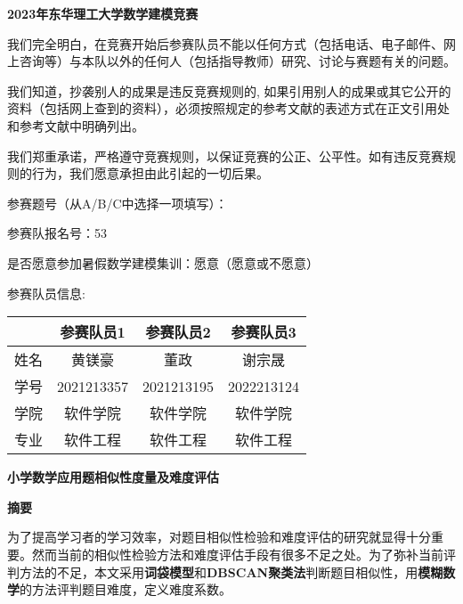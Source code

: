 \thispagestyle{empty}   %

\begin{center}
    \textbf{\fontsize{30}{1.5} 2023年东华理工大学数学建模竞赛}
\end{center}

我们完全明白，在竞赛开始后参赛队员不能以任何方式（包括电话、电子邮件、网上咨询等）与本队以外的任何人（包括指导教师）研究、讨论与赛题有关的问题。

我们知道，抄袭别人的成果是违反竞赛规则的, 如果引用别人的成果或其它公开的资料（包括网上查到的资料），必须按照规定的参考文献的表述方式在正文引用处和参考文献中明确列出。

我们郑重承诺，严格遵守竞赛规则，以保证竞赛的公正、公平性。如有违反竞赛规则的行为，我们愿意承担由此引起的一切后果。

参赛题号（从A/B/C中选择一项填写）：

参赛队报名号：53

是否愿意参加暑假数学建模集训：愿意（愿意或不愿意）\newline


{\fontsize{20}{2}参赛队员信息:}

\begin{table}[h]
    \centering
    \begin{tabular}{|c|c|c|c|}
    \hline
       & 参赛队员1      & 参赛队员2      & 参赛队员3      \\ \hline
    姓名 & 黄镁豪        & 董政         & 谢宗晟        \\ \hline
    学号 & 2021213357 & 2021213195 & 2022213124 \\ \hline
    学院 & 软件学院       & 软件学院       & 软件学院       \\ \hline
    专业 & 软件工程       & 软件工程       & 软件工程       \\ \hline
    \end{tabular}
\end{table}

%
%

\newpage
\thispagestyle{empty}

\begin{center}
    \textbf{\fontsize{20}{1.5}小学数学应用题相似性度量及难度评估}

    \textbf{摘要}
\end{center}

为了提高学习者的学习效率，对题目相似性检验和难度评估的研究就显得十分重要。然而当前的相似性检验方法和难度评估手段有很多不足之处。为了弥补当前评判方法的不足，本文采用\textbf{词袋模型}和\textbf{DBSCAN聚类法}判断题目相似性，用\textbf{模糊数学}的方法评判题目难度，定义难度系数。

